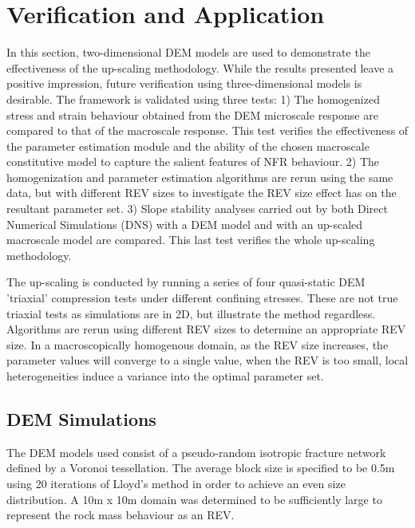 \chapter{Verification and Application}
In this section, two-dimensional DEM models are used to demonstrate the effectiveness of the up-scaling methodology. While the results presented leave a positive impression, future verification using three-dimensional models is desirable. The framework is validated using three tests: 1) The homogenized stress and strain behaviour obtained from the DEM microscale response are compared to that of the macroscale response. This test verifies the effectiveness of the parameter estimation module and the ability of the chosen macroscale constitutive model to capture the salient features of NFR behaviour. 2) The homogenization and parameter estimation algorithms are rerun using the same data, but with different REV sizes to investigate the REV size effect has on the resultant parameter set. 3) Slope stability analyses carried out by both Direct Numerical Simulations (DNS) with a DEM model and with an up-scaled macroscale model are compared. This last test verifies the whole up-scaling methodology.

The up-scaling is conducted by running a series of four quasi-static DEM 'triaxial' compression tests under different confining stresses. These are not true triaxial tests as simulations are in 2D, but illustrate the method regardless. Algorithms are rerun using different REV sizes to determine an appropriate REV size. In a macroscopically homogenous domain, as the REV size increases, the parameter values will converge to a single value, when the REV is too small, local heterogeneities induce a variance into the optimal parameter set.

\section{DEM Simulations}

The DEM models used consist of a pseudo-random isotropic fracture network defined by a Voronoi tessellation. The average block size is specified to be 0.5m using 20 iterations of Lloyd's method \citep{Lloyd_1982} in order to achieve an even size distribution. A 10m x 10m domain was determined to be sufficiently large to represent the rock mass behaviour as an REV. 

